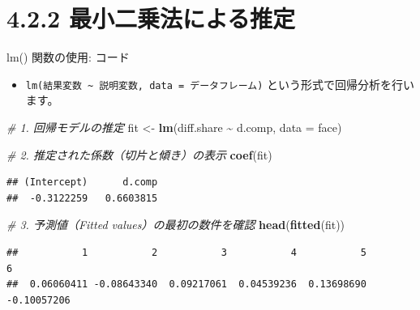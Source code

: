 \documentclass[
  ignorenonframetext,
]{beamer}
\newenvironment{Shaded}{\begin{snugshade}}{\end{snugshade}}
\newcommand{\AttributeTok}[1]{\textcolor[rgb]{0.13,0.29,0.53}{#1}}
\newcommand{\CommentTok}[1]{\textcolor[rgb]{0.56,0.35,0.01}{\textit{#1}}}
\newcommand{\FunctionTok}[1]{\textcolor[rgb]{0.13,0.29,0.53}{\textbf{#1}}}
\newcommand{\NormalTok}[1]{#1}
\newcommand{\OtherTok}[1]{\textcolor[rgb]{0.56,0.35,0.01}{#1}}
\newcommand{\SpecialCharTok}[1]{\textcolor[rgb]{0.81,0.36,0.00}{\textbf{#1}}}
\providecommand{\tightlist}{%
  \setlength{\itemsep}{0pt}\setlength{\parskip}{0pt}}
\begin{document}
\section{4.2.2
最小二乗法による推定}\label{ux6700ux5c0fux4e8cux4e57ux6cd5ux306bux3088ux308bux63a8ux5b9a}

\begin{frame}[fragile]{lm() 関数の使用: コード}
\label{lm-ux95a2ux6570ux306eux4f7fux7528-ux30b3ux30fcux30c9}
\begin{itemize}
\tightlist
\item
  \texttt{lm(結果変数\ \textasciitilde{}\ 説明変数,\ data\ =\ データフレーム)}
  という形式で回帰分析を行います。
\end{itemize}

\scriptsize

\begin{Shaded}
\begin{Highlighting}[]
\CommentTok{\# 1. 回帰モデルの推定}
\NormalTok{fit }\OtherTok{\textless{}{-}} \FunctionTok{lm}\NormalTok{(diff.share }\SpecialCharTok{\textasciitilde{}}\NormalTok{ d.comp, }\AttributeTok{data =}\NormalTok{ face)}

\CommentTok{\# 2. 推定された係数（切片と傾き）の表示}
\FunctionTok{coef}\NormalTok{(fit)}
\end{Highlighting}
\end{Shaded}

\begin{verbatim}
## (Intercept)      d.comp 
##  -0.3122259   0.6603815
\end{verbatim}

\begin{Shaded}
\begin{Highlighting}[]
\CommentTok{\# 3. 予測値（Fitted values）の最初の数件を確認}
\FunctionTok{head}\NormalTok{(}\FunctionTok{fitted}\NormalTok{(fit))}
\end{Highlighting}
\end{Shaded}

\begin{verbatim}
##           1           2           3           4           5           6 
##  0.06060411 -0.08643340  0.09217061  0.04539236  0.13698690 -0.10057206
\end{verbatim}

\normalsize
\end{frame}
\end{document}
